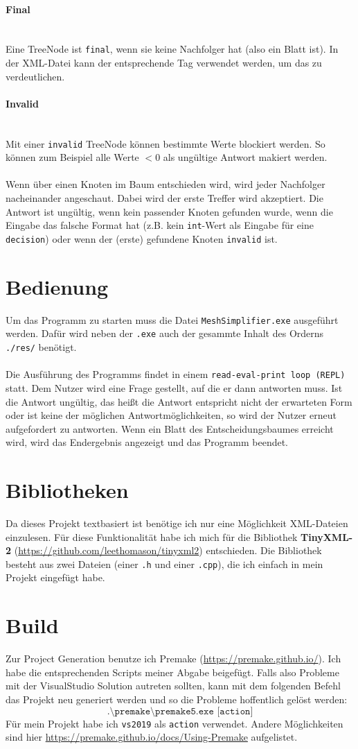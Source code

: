 \documentclass[a4paper,12pt]{article}
\newcommand{\myparagraph}[1]{\paragraph*{#1}\mbox{}\\}
\begin{document}
\myparagraph{Final}
Eine TreeNode ist \texttt{final}, wenn sie keine Nachfolger hat (also ein Blatt ist). In der XML-Datei kann der entsprechende Tag verwendet werden, um das zu verdeutlichen.

\myparagraph{Invalid}
Mit einer \texttt{invalid} TreeNode können bestimmte Werte blockiert werden. So können zum Beispiel alle Werte $<0$ als ungültige Antwort makiert werden.
\\
\\
Wenn über einen Knoten im Baum entschieden wird, wird jeder Nachfolger nacheinander angeschaut. Dabei wird der erste Treffer wird akzeptiert. Die Antwort ist ungültig, wenn kein passender Knoten gefunden wurde, wenn die Eingabe das falsche Format hat (z.B. kein \texttt{int}-Wert als Eingabe für eine \texttt{decision}) oder wenn der (erste) gefundene Knoten \texttt{invalid} ist. 

\newpage
\section*{Bedienung}

Um das Programm zu starten muss die Datei \texttt{MeshSimplifier.exe} ausgeführt werden. Dafür wird neben der \texttt{.exe} auch der gesammte Inhalt des Orderns \texttt{./res/} benötigt.
\\
\\
Die Ausführung des Programms findet in einem \texttt{read-eval-print loop (REPL)} statt. Dem Nutzer wird eine Frage gestellt, auf die er dann antworten muss. Ist die Antwort ungültig, das heißt die Antwort entspricht nicht der erwarteten Form oder ist keine der möglichen Antwortmöglichkeiten, so wird der Nutzer erneut aufgefordert zu antworten. 
Wenn ein Blatt des Entscheidungsbaumes erreicht wird, wird das Endergebnis angezeigt und das Programm beendet.

\section*{Bibliotheken}

Da dieses Projekt textbasiert ist benötige ich nur eine Möglichkeit XML-Dateien einzulesen. Für diese Funktionalität habe ich mich für die Bibliothek \textbf{TinyXML-2} (\url{https://github.com/leethomason/tinyxml2}) entschieden.
Die Bibliothek besteht aus zwei Dateien (einer \texttt{.h} und einer \texttt{.cpp}), die ich einfach in mein Projekt eingefügt habe.

\section*{Build}

Zur Project Generation benutze ich Premake (\url{https://premake.github.io/}). Ich habe die entsprechenden Scripts meiner Abgabe beigefügt.
Falls also Probleme mit der VisualStudio Solution autreten sollten,
kann mit dem folgenden Befehl das Projekt neu generiert werden und so die Probleme hoffentlich gelöst werden:
\[\texttt{.\textbackslash premake\textbackslash premake5.exe [action]}\]
Für mein Projekt habe ich \texttt{vs2019} als \texttt{action} verwendet. Andere Möglichkeiten sind hier \url{https://premake.github.io/docs/Using-Premake} aufgelistet.
\end{document}
